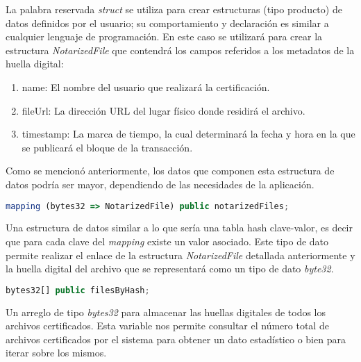 La palabra reservada \textit{struct} se utiliza para crear estructuras (tipo producto)  de datos definidos por el usuario; su comportamiento y declaración es similar a cualquier lenguaje de programación. En este caso se utilizará para crear la estructura \textit{NotarizedFile} que contendrá los campos referidos a los metadatos de la huella digital:

\begin{enumerate}
  \item name: El nombre del usuario que realizará la certificación.
  \item fileUrl: La dirección URL del lugar físico donde residirá el archivo.
  \item timestamp: La marca de tiempo, la cual determinará la fecha y hora en la que se publicará el bloque de la transacción.
\end{enumerate}

Como se mencionó anteriormente, los datos que componen esta estructura de datos podría ser mayor, dependiendo de las necesidades de la aplicación.

\begin{minipage}{\linewidth}
  \begin{lstlisting}[frame=single, belowskip=1em, aboveskip=2em,  language=javascript, captionpos=b, caption=Variable de estado notarizedFiles, label={lst:post_archivo}]
    mapping (bytes32 => NotarizedFile) public notarizedFiles;
  \end{lstlisting}
\end{minipage}

Una estructura de datos similar a lo que sería una tabla hash clave-valor, es decir que para cada clave del \textit{mapping} existe un valor asociado. Este tipo de dato permite realizar el enlace de la estructura \textit{NotarizedFile} detallada anteriormente y la huella digital del archivo que se representará como un tipo de dato \textit{byte32}.

\begin{minipage}{\linewidth}
  \begin{lstlisting}[frame=single, belowskip=1em, aboveskip=2em,  language=javascript, captionpos=b, caption=Variable de estado filesByHash, label={lst:post_archivo}]
    bytes32[] public filesByHash;
  \end{lstlisting}
\end{minipage}

Un arreglo de tipo \textit{bytes32} para almacenar las huellas digitales de todos los archivos certificados. Esta variable nos permite consultar el número total de archivos certificados por el sistema para obtener un dato estadístico o bien para iterar sobre los mismos.

